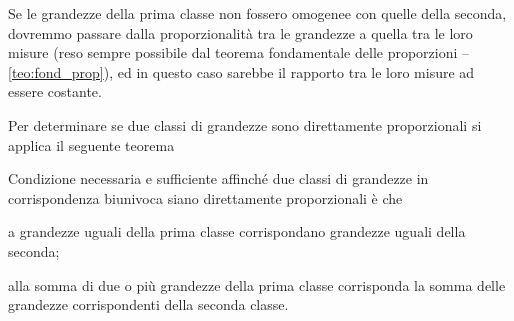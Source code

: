 Se le grandezze della prima classe non fossero omogenee con quelle della seconda, dovremmo passare dalla proporzionalità tra le grandezze a quella tra le loro misure (reso sempre possibile dal teorema fondamentale delle proporzioni -- \ref{teo:fond_prop}), ed in questo caso sarebbe il rapporto tra le loro misure ad essere costante.

Per determinare se due classi di grandezze sono direttamente proporzionali si applica il seguente teorema
\begin{teorema}\label{teo:6.1}
Condizione necessaria e sufficiente affinché due classi di grandezze in corrispondenza biunivoca siano direttamente proporzionali è che
\begin{itemize*}
\item a grandezze uguali della prima classe corrispondano grandezze uguali della seconda;
\item alla somma di due o più grandezze della prima classe corrisponda la somma delle grandezze corrispondenti della seconda classe.
\end{itemize*}
\end{teorema}

